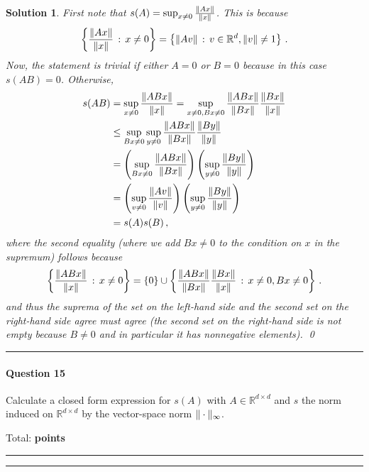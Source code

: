 \documentclass{article}
\newcommand{\R}{\mathbb{R}}
\DeclareMathOperator*{\1}{\mathbbm{1}}
\newcounter{DocPoints} %
\newcounter{QuestionPoints} %
\newcommand{\tpoints}[1]{        %
	\ifthenelse{\isempty{#1}}%
	{%
	}%
	{%
		\addtocounter{DocPoints}{#1}
		\addtocounter{QuestionPoints}{#1}
	}													 %
	\par\mbox{}\par\noindent\hfill {Total: \bf \arabic{QuestionPoints}\xspace points}\par\mbox{}\par\hrule\hrule
	\setcounter{QuestionPoints}{0}
}
\newtheorem*{solution*}{Solution}
\begin{document}
\begin{solution*}
\newcommand{\setg}[1]{\left\{#1\right\}}
First note that $s(A) = \sup_{x\ne 0} \frac{\|Ax\|}{\|x\|}$.
This is because 
\begin{align*}
\setg{ \frac{\norm{Ax}}{\norm{x}} \,:\, x\ne 0 } = 
\setg{ \norm{Av} \,:\, v\in \R^d, \norm{v}\ne 1 } \,.
\end{align*}
Now, the statement is trivial if either $A=0$ or $B=0$ because in this case $s(AB)=0$.
Otherwise,
\begin{align*}
s(AB) 
& = \sup_{x\ne 0} \frac{ \| AB x\| }{\|x\|} 
 = \sup_{x\ne 0,Bx \ne 0} \frac{ \| AB x\| }{\|Bx\|}   \frac{\|Bx\|}{\|x\|}\\
& \le \sup_{Bx \ne 0} \sup_{y\ne 0} \frac{ \| AB x\| }{\|Bx\|}   \frac{\|By\|}{\|y\|}\\
& =
 \left(\sup_{Bx \ne 0}  \frac{ \| AB x\| }{\|Bx\|} \right)
 \left(\sup_{y\ne 0}  \frac{\|By\|}{\|y\|}\right)
 \\
& =
\left(\sup_{v \ne 0}  \frac{ \| Av\| }{\|v\|} \right) 
\left(\sup_{y\ne 0}  \frac{\|By\|}{\|y\|}\right)\\
& = s(A) s(B)\,,
\end{align*}
where the second equality (where we add $Bx \ne 0$ to the condition on $x$ in the supremum) follows because 
\begin{align*}
\setg{ \frac{ \norm{ AB x} }{\norm{x}}\,:\, x \ne 0 }
=
\setg{ 0 } \cup 
\setg{ \frac{ \norm{ AB x} }{\norm{Bx}}   \frac{\norm{Bx}}{\norm{x}}\,:\, x \ne 0, Bx\ne 0 }\,.
\end{align*}
and thus the suprema of the set  on the left-hand side and the second set on the right-hand side agree must agree (the second set on the right-hand side is not empty because $B\ne 0$ and in particular it has nonnegative elements).
\qed\par\bigskip\par\hrule
\end{solution*}


\paragraph{Question 15}
Calculate a closed form expression for $s(A)$ with $A\in \R^{d\times d}$ and $s$ the norm induced on $\R^{d\times d}$ by the vector-space norm $\|\cdot\|_\infty$.
\tpoints{5}
\end{document}
